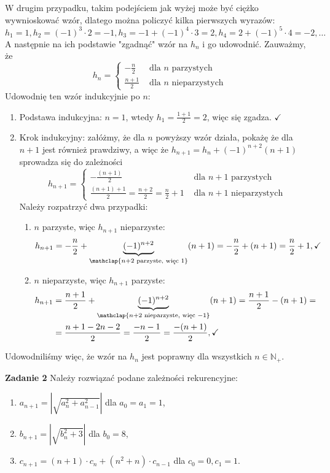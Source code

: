 \documentclass[a4paper,12pt]{article}
\newcommand{\abs}[1]{\left| #1 \right|}					%
\begin{document}
\noindent W drugim przypadku, takim podejściem jak wyżej może być ciężko wywnioskować wzór, dlatego można policzyć kilka pierwszych wyrazów:
\[ h_1 = 1, h_2 = (-1)^{3}\cdot 2 = -1, h_3 = -1 + (-1)^4 \cdot 3 = 2, h_4 = 2 + (-1)^5\cdot 4 = -2, \ldots \]
A następnie na ich podstawie "zgadnąć" wzór na $h_n$ i go udowodnić. Zauważmy, że
\[ h_n =
	\begin{cases}
	- \frac{n}{2} 	&\text{ dla } n \text{ parzystych} \\
	\frac{n+1}{2} 	&\text{ dla } n \text{ nieparzystych}
	\end{cases}
\]
Udowodnię ten wzór indukcyjnie po $n$:
\begin{enumerate}
	\item Podstawa indukcyjna: $n=1$, wtedy $h_1 = \frac{1+1}{2} = 2$, więc się zgadza. $\checkmark$
	\item Krok indukcyjny: załóżmy, że dla $n$ powyższy wzór działa, pokażę że dla $n+1$ jest również prawdziwy, a więc że $h_{n+1} = h_n + (-1)^{n+2}(n+1)$ sprowadza się do zależności
	\[ h_{n+1} =
	\begin{cases}
	- \frac{(n+1)}{2}									&\text{ dla } n+1 \text{ parzystych} \\
	\frac{(n+1)+1}{2} = \frac{n+2}{2} = \frac{n}{2} + 1	&\text{ dla } n+1 \text{ nieparzystych}
	\end{cases}
	\]
	Należy rozpatrzyć dwa przypadki:
	\begin{enumerate}
		\item $n$ parzyste, więc $h_{n+1}$ nieparzyste:
		\[ h_{n+1} = -\frac{n}{2} + \underbrace{(-1)^{n+2}}_{\mathclap{n+2 \text{ parzyste, więc } 1}} (n+1) = -\frac{n}{2} + (n + 1) = \frac{n}{2} + 1, \checkmark \]
			
		\item $n$ nieparzyste, więc $h_{n+1}$ parzyste: 
		\begin{align*}
			h_{n+1} &= \frac{n+1}{2} + \underbrace{(-1)^{n+2}}_{\mathclap{n+2 \text{ nieparzyste, więc } -1}} (n+1) = \frac{n+1}{2} - (n + 1) = \\ 
					&= \frac{n + 1 - 2n - 2}{2} = \frac{-n - 1}{2} = \frac{-(n+1)}{2}, \checkmark
		\end{align*}
	\end{enumerate}
\end{enumerate}
Udowodniliśmy więc, że wzór na $h_n$ jest poprawny dla wszystkich $n \in \mathbb{N}_+$.

\noindent \newline \textbf{Zadanie 2} \newline
Należy rozwiązać podane zależności rekurencyjne:
\begin{enumerate}
	\item $a_{n+1} = \abs{\sqrt{a_n^2 + a_{n-1}^2}}$ dla $a_0 = a_1 = 1$,
	\item $b_{n+1} = \abs{\sqrt{b_n^2 + 3}}$ dla $b_0 = 8$,
	\item $c_{n+1} = (n+1) \cdot c_n + (n^2 + n) \cdot c_{n-1}$ dla $c_0 = 0, c_1 = 1$.
\end{enumerate}
\end{document}
